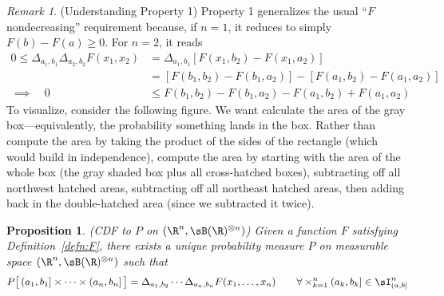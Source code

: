 \documentclass[12pt]{article}
\theoremstyle{plain}
\newtheorem{prop}[thm]{Proposition}
\theoremstyle{definition}
\theoremstyle{remark}
\newtheorem*{rmk}{Remark}
\begin{document}
\begin{rmk}(Understanding Property 1)
Property 1 generalizes the usual ``$F$ nondecreasing'' requirement
because, if $n=1$, it reduces to simply $F(b) - F(a) \geq 0$.
For $n=2$, it reads
\begin{align*}
  0 \leq
  \Delta_{a_1,b_1}
  \Delta_{a_2,b_2}
  F(x_1,x_2)
  &=
  \Delta_{a_1,b_1}
  \left[F(x_1,b_2)-F(x_1,a_2)\right] \\
  &=
  \left[F(b_1,b_2)-F(b_1,a_2)\right]
  -
  \left[F(a_1,b_2)-F(a_1,a_2)\right] \\
  \implies\quad
  0
  &\leq
  F(b_1,b_2)-F(b_1,a_2)
  - F(a_1,b_2)+F(a_1,a_2)
\end{align*}
To visualize, consider the following figure. We want calculate the area
of the gray box---equivalently, the probability something lands in
the box. Rather than compute the area by taking the product of the
sides of the rectangle (which would build in independence), compute the
area by starting with the area of the whole box (the gray shaded box
plus all cross-hatched boxes), subtracting off all northwest hatched
areas, subtracting off all northeast hatched areas, then adding back in
the double-hatched area (since we subtracted it twice).
\begin{figure}[htpb!]
\centering
{}
\end{figure}
\end{rmk}

\begin{prop}
\emph{(CDF to $P$ on $(\R^n,\sB(\R)^{\otimes n})$)}
Given a function $F$ satisfying Definition~\ref{defn:F}, there exists a
unique probability measure $P$ on measurable space
$(\R^n,\sB(\R)^{\otimes n})$ such that
\begin{align*}
  P\big[\, (a_1,b_1]\times\cdots\times(a_n,b_n] \,\big] =
  \Delta_{a_1,b_2}
  \cdots
  \Delta_{a_n,b_n}
  F(x_1,\ldots,x_n)
  \qquad \forall \times_{k=1}^n (a_k,b_k]\in\sI_{(a,b]}^n
\end{align*}
\end{prop}
\end{document}
